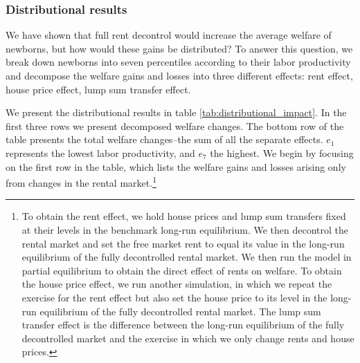 \documentclass[parskip=full]{article}
\begin{document}
\subsubsection{Distributional results} 

We have shown that full rent decontrol would increase the average welfare of newborns, but how would these gains be distributed? To answer this question, we break down newborns into seven percentiles according to their labor productivity and decompose the welfare gains and losses into three different effects: rent effect, house price effect, lump sum transfer effect. 

We present the distributional results in table \ref{tab:distributional_impact}. In the first three rows we present decomposed welfare changes. The bottom row of the table presents the total welfare changes--the sum of all the separate effects. $e_{1}$ represents the lowest labor productivity, and $e_{7}$ the highest. We begin by focusing on the first row in the table, which lists the welfare gains and losses arising only from changes in the rental market.\footnote{To obtain the rent effect, we hold house prices and lump sum transfers fixed at their levels in the benchmark long-run equilibrium. We then decontrol the rental market and set the free market rent to equal its value in the long-run equilibrium of the fully decontrolled rental market. We then run the model in partial equilibrium to obtain the direct effect of rents on welfare. To obtain the house price effect, we run another simulation, in which we repeat the exercise for the rent effect but also set the house price to its level in the long-run equilibrium of the fully decontrolled rental market. The lump sum transfer effect is the difference between the long-run equilibrium of the fully decontrolled market and the exercise in which we only change rents and house prices.} 
\end{document}
